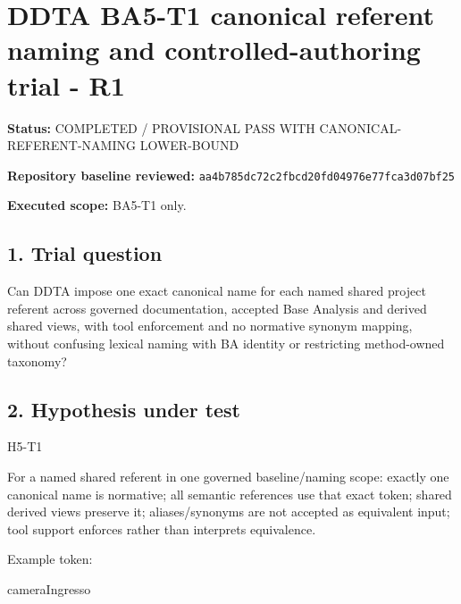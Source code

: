 \documentclass[
  10pt,
  a4paper,
]{article}
\author{}
\date{}
\newenvironment{Shaded}{}{}
\newcommand{\NormalTok}[1]{#1}
\begin{document}
\section{DDTA BA5-T1 canonical referent naming and controlled-authoring
trial -
R1}\label{ddta-ba5-t1-canonical-referent-naming-and-controlled-authoring-trial---r1}

\textbf{Status:} COMPLETED / PROVISIONAL PASS WITH
CANONICAL-REFERENT-NAMING LOWER-BOUND

\textbf{Repository baseline reviewed:}
\texttt{aa4b785dc72c2fbcd20fd04976e77fca3d07bf25}

\textbf{Executed scope:} BA5-T1 only.

\subsection{1. Trial question}\label{trial-question}

Can DDTA impose one exact canonical name for each named shared project
referent across governed documentation, accepted Base Analysis and
derived shared views, with tool enforcement and no normative synonym
mapping, without confusing lexical naming with BA identity or
restricting method-owned taxonomy?

\subsection{2. Hypothesis under test}\label{hypothesis-under-test}

\begin{Shaded}
\begin{Highlighting}[]
\NormalTok{H5{-}T1}

\NormalTok{For a named shared referent in one governed baseline/naming scope:}
\NormalTok{  exactly one canonical name is normative;}
\NormalTok{  all semantic references use that exact token;}
\NormalTok{  shared derived views preserve it;}
\NormalTok{  aliases/synonyms are not accepted as equivalent input;}
\NormalTok{  tool support enforces rather than interprets equivalence.}
\end{Highlighting}
\end{Shaded}

Example token:

\begin{Shaded}
\begin{Highlighting}[]
\NormalTok{cameraIngresso}
\end{Highlighting}
\end{Shaded}
\end{document}
